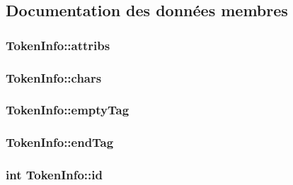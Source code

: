 \subsection{Documentation des données membres}
\hypertarget{struct_token_info_a811b08400dcdf6aa65b3fd3149b890c9}{}
\subsubsection[{attribs}]{ Token\+Info\+::attribs}\label{struct_token_info_a811b08400dcdf6aa65b3fd3149b890c9}
\hypertarget{struct_token_info_a7dc1ad1cf0a4e237d7be47b02092d6eb}{}
\subsubsection[{chars}]{ Token\+Info\+::chars}\label{struct_token_info_a7dc1ad1cf0a4e237d7be47b02092d6eb}
\hypertarget{struct_token_info_afc2259af930fe0364268ed684b558629}{}
\subsubsection[{empty\+Tag}]{ Token\+Info\+::empty\+Tag}\label{struct_token_info_afc2259af930fe0364268ed684b558629}
\hypertarget{struct_token_info_a8492fcbbf13ce7dbb7fa8d1eaa9d1e91}{}
\subsubsection[{end\+Tag}]{ Token\+Info\+::end\+Tag}\label{struct_token_info_a8492fcbbf13ce7dbb7fa8d1eaa9d1e91}
\hypertarget{struct_token_info_ab9c0ff8ec2c582d0e55e80ae35ec6d7e}{}
\subsubsection[{id}]{\setlength{\rightskip}{0pt plus 5cm}int Token\+Info\+::id}\label{struct_token_info_ab9c0ff8ec2c582d0e55e80ae35ec6d7e}
\hypertarget{struct_token_info_aaa051d5e146647070e9a82f545243e46}{}
